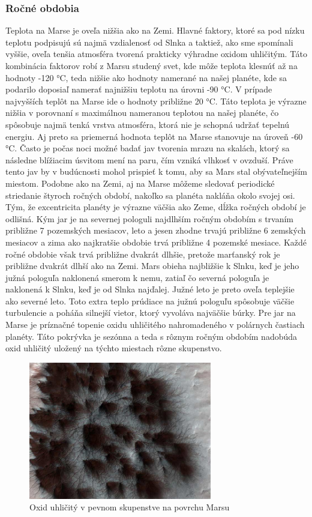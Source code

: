 \subsubsection{Ročné obdobia}
Teplota na Marse je oveľa nižšia ako na Zemi. Hlavné faktory, ktoré sa pod nízku teplotu podpisujú sú najmä vzdialenosť od Slnka a taktiež, ako sme spomínali vyššie, oveľa tenšia atmosféra tvorená prakticky výhradne oxidom uhličitým. Táto kombinácia faktorov robí z Marsu studený svet, kde môže teplota klesnúť až na hodnoty -120 °C, teda nižšie ako hodnoty namerané na našej planéte, kde sa podarilo doposiaľ namerať najnižšiu teplotu na úrovni -90 °C. V prípade najvyšších teplôt na Marse ide o hodnoty približne 20 °C. Táto teplota je výrazne nižšia v porovnaní s maximálnou nameranou teplotou na našej planéte, čo spôsobuje najmä tenká vrstva atmosféra, ktorá nie je schopná udržať tepelnú energiu. Aj preto sa priemerná hodnota teplôt na Marse stanovuje na úroveň -60 °C. Často je počas noci možné badať jav tvorenia mrazu na skalách, ktorý sa následne blížiacim úsvitom mení na paru, čím vzniká vlhkosť v ovzduší. Práve tento jav by v budúcnosti mohol prispieť k tomu, aby sa Mars stal obývateľnejším miestom. 
Podobne ako na Zemi, aj na Marse môžeme sledovať periodické striedanie štyroch ročných období, nakoľko sa planéta nakláňa okolo svojej osi. Tým, že excentricita planéty je výrazne väčšia ako Zeme, dĺžka ročných období je odlišná. Kým jar je na severnej pologuli najdlhším ročným obdobím s trvaním približne 7 pozemských mesiacov, leto a jesen zhodne trvajú približne 6 zemských mesiacov a zima ako najkratšie obdobie trvá približne 4 pozemské mesiace.
Každé ročné obdobie však trvá približne dvakrát dlhšie, pretože marťanský rok je približne dvakrát dlhší ako na Zemi. Mars obieha najbližšie k Slnku, keď je jeho južná pologuľa naklonená smerom k nemu, zatiaľ čo severná pologuľa je naklonená k Slnku, keď je od Slnka najďalej. Južné leto je preto oveľa teplejšie ako severné leto. Toto extra teplo prúdiace na južnú pologuľu spôsobuje väčšie turbulencie a poháňa silnejší vietor, ktorý vyvoláva najväčšie búrky. 
Pre jar na Marse je príznačné topenie oxidu uhličitého nahromadeného v polárnych častiach planéty. Táto pokrývka je sezónna a teda s rôznym ročným obdobím nadobúda oxid uhličitý uložený na týchto miestach rôzne skupenstvo.
\begin{figure}[!htbp]
  \centering
  \includegraphics[width=8cm]{img/co2.jpg}
  \caption{Oxid uhličitý v pevnom skupenstve na povrchu Marsu}
  \label{co2}
\end{figure}

